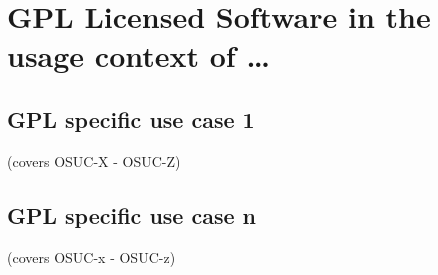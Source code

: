 %
%
%
%
%



\section{GPL Licensed Software in the usage context of \ldots}
\label{OSUC-01-GPL} \label{OSUC-03-GPL} 
\label{OSUC-06-GPL} \label{OSUC-09-GPL}

\label{OSUC-02-GPL} \label{OSUC-04-GPL} \label{OSUC-05-GPL}
\label{OSUC-07-GPL} \label{OSUC-08-GPL} \label{OSUC-10-GPL}


\subsection{GPL specific use case 1}
(covers OSUC-X - OSUC-Z)

\subsection{GPL specific use case n}
(covers OSUC-x - OSUC-z)


%

